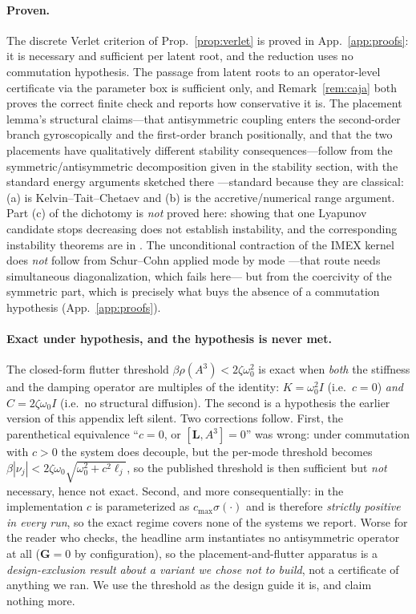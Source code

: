 \documentclass{article}
\begin{document}
{\paragraph{Proven.} The discrete Verlet criterion of
Prop.~\ref{prop:verlet} is proved in App.~\ref{app:proofs}: it is necessary
and sufficient per latent root, and the reduction uses no commutation
hypothesis. The passage from latent roots to an operator-level certificate via
the parameter box is sufficient only, and Remark~\ref{rem:caja} both proves the
correct finite check and reports how conservative it is.
The placement lemma's structural claims---that
antisymmetric coupling enters the second-order branch gyroscopically and
the first-order branch positionally, and that the two placements have
qualitatively different stability consequences---follow from the
symmetric/antisymmetric decomposition given in the stability section,
with the standard energy arguments sketched there ---standard because they
are classical: (a) is Kelvin--Tait--Chetaev and (b) is the accretive/numerical
range argument. Part (c) of the dichotomy is \emph{not} proved here: showing
that one Lyapunov candidate stops decreasing does not establish instability,
and the corresponding instability theorems are in
\citet{bulatovic1999stability}. The unconditional contraction of the IMEX
kernel does \emph{not} follow from Schur--Cohn applied mode by mode ---that
route needs simultaneous diagonalization, which fails here--- but from the
coercivity of the symmetric part, which is precisely what buys the absence of
a commutation hypothesis (App.~\ref{app:proofs}).

\paragraph{Exact under hypothesis, and the hypothesis is never met.} The
closed-form flutter threshold $\beta\rho(A^3)<2\zeta\omega_0^2$ is exact when
\emph{both} the stiffness and the damping operator are multiples of the
identity: $K=\omega_0^2 I$ (i.e.\ $c=0$) \emph{and} $C=2\zeta\omega_0 I$
(i.e.\ no structural diffusion). The second is a hypothesis the earlier
version of this appendix left silent. Two corrections follow. First, the
parenthetical equivalence ``$c=0$, or $[\mathbf{L},A^3]=0$'' was wrong: under
commutation with $c>0$ the system does decouple, but the per-mode threshold
becomes $\beta|\nu_j|<2\zeta\omega_0\sqrt{\omega_0^2+c^2\ell_j}$, so the
published threshold is then sufficient but \emph{not} necessary, hence not
exact. Second, and more consequentially: in the implementation $c$ is
parameterized as $c_{\max}\sigma(\cdot)$ and is therefore \emph{strictly
positive in every run}, so the exact regime covers none of the systems we
report. Worse for the reader who checks, the headline arm instantiates no
antisymmetric operator at all ($\mathbf{G}=0$ by configuration), so the
placement-and-flutter apparatus is a \emph{design-exclusion result about a
variant we chose not to build}, not a certificate of anything we ran. We use
the threshold as the design guide it is, and claim nothing more.

}
\end{document}
